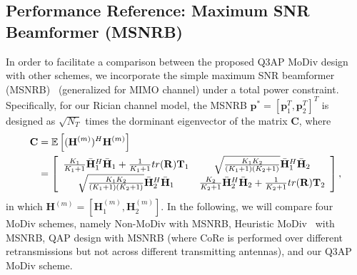 \documentclass[journal,draftcls,onecolumn,12pt,twoside]{IEEEtran}
\begin{document}
\subsection{Performance Reference: Maximum SNR
Beamformer (MSNRB)}
In order to facilitate a comparison between the proposed Q3AP
MoDiv design with other schemes, we incorporate the simple maximum SNR
beamformer (MSNRB)~\cite{barriac2006space} (generalized for MIMO channel) under
a total power constraint.
Specifically, for our Rician channel model, the MSNRB $\mathbf{p}^* =
[\mathbf{p}_1^T, \mathbf{p}_2^T]^T$ is designed as $\sqrt{N_T}$ times the
dorminant eigenvector of the matrix $\mathbf{C}$, where
\begin{align}
  \mathbf{C} & = \mathbb{E}\left[
    (\mathbf{H}^{(m)})^H \mathbf{H}^{(m)}
  \right] \notag \\
  & = \left[
    \begin{array}{cc}
      \frac{K_1}{K_1+1}\bar{\mathbf{H}}_1^H\bar{\mathbf{H}}_1 + \frac{1}{K_1+1}
      \mbox{tr}(\mathbf{R})\mathbf{T}_1 &
      \sqrt{\frac{K_1K_2}{(K_1+1)(K_2+1)}} \bar{\mathbf{H}}_1^H
      \bar{\mathbf{H}}_2
      \\
      \sqrt{\frac{K_1K_2}{(K_1+1)(K_2+1)}} \bar{\mathbf{H}}_2^H
      \bar{\mathbf{H}}_1 &
      \frac{K_2}{K_2+1}\bar{\mathbf{H}}_2^H\bar{\mathbf{H}}_2 + \frac{1}{K_2+1}
      \mbox{tr}(\mathbf{R})\mathbf{T}_2
    \end{array}
  \right],
\end{align}
in which $\mathbf{H}^{(m)} = [\mathbf{H}_1^{(m)}, \mathbf{H}_2^{(m)}]$. In
the following, we will compare four MoDiv schemes, namely Non-MoDiv with MSNRB,
Heuristic MoDiv~\cite{panasonic2001enhanced} with MSNRB, QAP design with MSNRB
(where CoRe is performed over different retransmissions but not across different
transmitting antennas), and our Q3AP MoDiv scheme.
\end{document}
